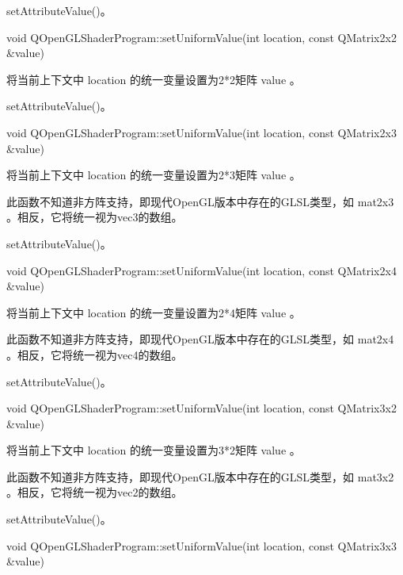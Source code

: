 \begin{seeAlso}
setAttributeValue()。
\end{seeAlso}

void QOpenGLShaderProgram::setUniformValue(int location, const QMatrix2x2 \&value)

将当前上下文中 location 的统一变量设置为2*2矩阵 value 。


\begin{seeAlso}
setAttributeValue()。
\end{seeAlso}

void QOpenGLShaderProgram::setUniformValue(int location, const QMatrix2x3 \&value)

将当前上下文中 location 的统一变量设置为2*3矩阵 value 。

\begin{notice}
此函数不知道非方阵支持，即现代OpenGL版本中存在的GLSL类型，如 mat2x3 。相反，它将统一视为vec3的数组。
\end{notice}

\begin{seeAlso}
setAttributeValue()。
\end{seeAlso}

void QOpenGLShaderProgram::setUniformValue(int location, const QMatrix2x4 \&value)

将当前上下文中 location 的统一变量设置为2*4矩阵 value 。

\begin{notice}
此函数不知道非方阵支持，即现代OpenGL版本中存在的GLSL类型，如 mat2x4 。相反，它将统一视为vec4的数组。
\end{notice}

\begin{seeAlso}
setAttributeValue()。
\end{seeAlso}

void QOpenGLShaderProgram::setUniformValue(int location, const QMatrix3x2 \&value)

将当前上下文中 location 的统一变量设置为3*2矩阵 value 。

\begin{notice}
此函数不知道非方阵支持，即现代OpenGL版本中存在的GLSL类型，如 mat3x2 。相反，它将统一视为vec2的数组。
\end{notice}

\begin{seeAlso}
setAttributeValue()。
\end{seeAlso}

void QOpenGLShaderProgram::setUniformValue(int location, const QMatrix3x3 \&value)

